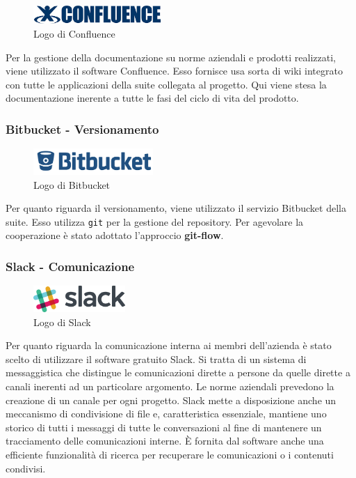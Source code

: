 \begin{figure}[H]
\begin{center}
\includegraphics[height=0.7cm]{Pics/confluence_logo.jpeg}
\caption{Logo di Confluence}
\end{center}
\end{figure}

Per la gestione della documentazione su norme aziendali e prodotti realizzati, viene utilizzato il software Confluence. Esso fornisce usa sorta di wiki integrato con tutte le applicazioni della suite collegata al progetto. Qui viene stesa la documentazione inerente a tutte le fasi del ciclo di vita del prodotto.

\subsubsection{Bitbucket - Versionamento}
\begin{figure}[H]
\begin{center}
\includegraphics[height=1cm]{Pics/bitbucket_logo.png}
\caption{Logo di Bitbucket}
\end{center}
\end{figure}

Per quanto riguarda il versionamento, viene utilizzato il servizio Bitbucket della suite. Esso utilizza \texttt{git} per la gestione del repository. 
 Per agevolare la cooperazione è stato adottato l'approccio \textbf{git-flow}. 

\subsubsection{Slack - Comunicazione}

\begin{figure}[htbp]
\begin{center}
\includegraphics[height=1cm]{Pics/slack_logo.png}
\caption{Logo di Slack}
\end{center}
\end{figure}

Per quanto riguarda la comunicazione interna ai membri dell'azienda è stato scelto di utilizzare il software gratuito Slack. 
Si tratta di un sistema di messaggistica che distingue le comunicazioni dirette a persone da quelle dirette a canali inerenti ad un particolare argomento. Le norme aziendali prevedono la creazione di un canale per ogni progetto.
Slack mette a disposizione anche un meccanismo di condivisione di file e, caratteristica essenziale, mantiene uno storico di tutti i messaggi di tutte le conversazioni al fine di mantenere un tracciamento delle comunicazioni interne. 
È fornita dal software anche una efficiente funzionalità di ricerca per recuperare le comunicazioni o i contenuti condivisi.
